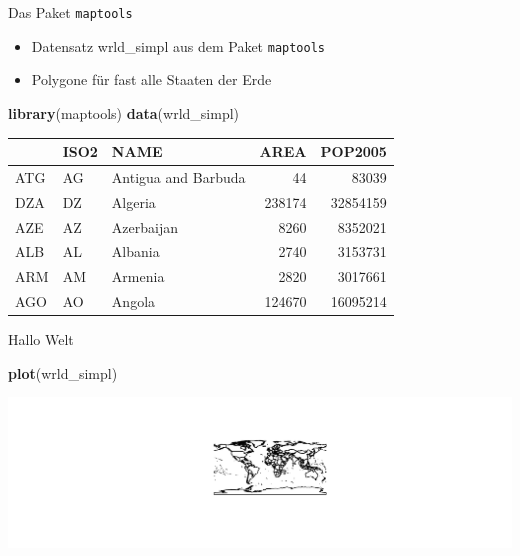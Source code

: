 \documentclass[ignorenonframetext,]{beamer}
\newenvironment{Shaded}{\begin{snugshade}}{\end{snugshade}}
\newcommand{\KeywordTok}[1]{\textcolor[rgb]{0.13,0.29,0.53}{\textbf{#1}}}
\newcommand{\NormalTok}[1]{#1}
\providecommand{\tightlist}{%
  \setlength{\itemsep}{0pt}\setlength{\parskip}{0pt}}
\begin{document}
\begin{frame}[fragile]{Das Paket \texttt{maptools}}
\protect\hypertarget{das-paket-maptools}{}

\begin{itemize}
\tightlist
\item
  Datensatz wrld\_simpl aus dem Paket \texttt{maptools}
\item
  Polygone für fast alle Staaten der Erde
\end{itemize}

\begin{Shaded}
\begin{Highlighting}[]
\KeywordTok{library}\NormalTok{(maptools)}
\KeywordTok{data}\NormalTok{(wrld_simpl)}
\end{Highlighting}
\end{Shaded}

\begin{longtable}[]{@{}lllrr@{}}
\toprule
& ISO2 & NAME & AREA & POP2005\tabularnewline
\midrule
\endhead
ATG & AG & Antigua and Barbuda & 44 & 83039\tabularnewline
DZA & DZ & Algeria & 238174 & 32854159\tabularnewline
AZE & AZ & Azerbaijan & 8260 & 8352021\tabularnewline
ALB & AL & Albania & 2740 & 3153731\tabularnewline
ARM & AM & Armenia & 2820 & 3017661\tabularnewline
AGO & AO & Angola & 124670 & 16095214\tabularnewline
\bottomrule
\end{longtable}

\end{frame}

\begin{frame}[fragile]{Hallo Welt}
\protect\hypertarget{hallo-welt}{}

\begin{Shaded}
\begin{Highlighting}[]
\KeywordTok{plot}\NormalTok{(wrld_simpl)}
\end{Highlighting}
\end{Shaded}

\includegraphics{Choroplethen_files/figure-beamer/unnamed-chunk-3-1.pdf}

\end{frame}
\end{document}

